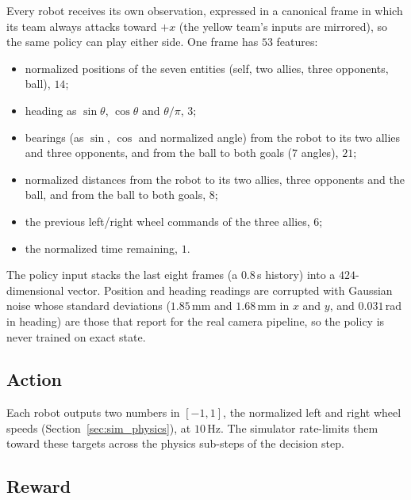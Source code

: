 Every robot receives its own observation, expressed in a canonical frame in which its
team always attacks toward $+x$ (the yellow team's inputs are mirrored), so the same
policy can play either side.  One frame has $53$ features:
\begin{itemize}
  \item normalized positions of the seven entities (self, two allies, three opponents, ball), $14$;
  \item heading as $\sin\theta$, $\cos\theta$ and $\theta/\pi$, $3$;
  \item bearings (as $\sin$, $\cos$ and normalized angle) from the robot to its two allies and three opponents, and from the ball to both goals ($7$ angles), $21$;
  \item normalized distances from the robot to its two allies, three opponents and the ball, and from the ball to both goals, $8$;
  \item the previous left/right wheel commands of the three allies, $6$;
  \item the normalized time remaining, $1$.
\end{itemize}
The policy input stacks the last eight frames (a $0.8$\,s history) into a $424$-dimensional
vector.  Position and heading readings are corrupted with Gaussian noise whose standard
deviations ($1.85$\,mm and $1.68$\,mm in $x$ and $y$, and $0.031$\,rad in heading) are those that \textcite{brandao2022} report
for the real camera pipeline, so the policy is never trained on exact state.

\subsection{Action}

Each robot outputs two numbers in $[-1,1]$, the normalized left and right wheel
speeds (Section~\ref{sec:sim_physics}), at $10$\,Hz.  The simulator rate-limits them toward these targets
across the physics sub-steps of the decision step.

\subsection{Reward}
\label{sec:reward}

